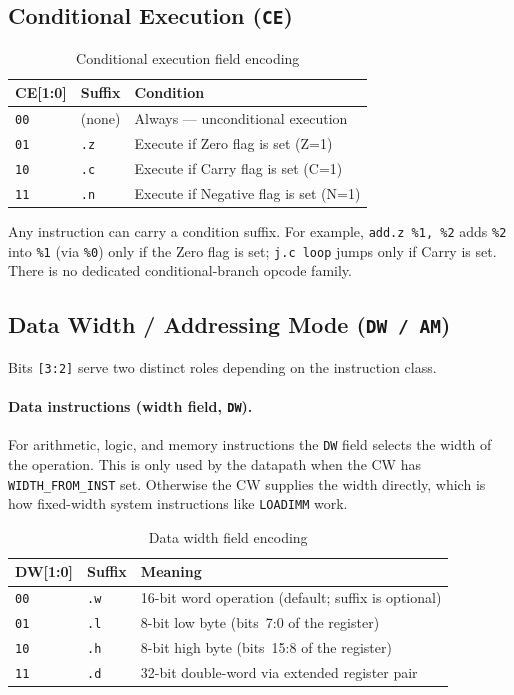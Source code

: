 \documentclass[a4paper,12pt]{report}
\newcommand{\asm}[1]{\texttt{#1}}
\newcommand{\field}[1]{\texttt{\small #1}}
\newcommand{\reg}[1]{\texttt{\%#1}}
\begin{document}
\subsection{Conditional Execution (\field{CE})}
\label{sec:cond}

\begin{table}[htbp]
\centering
\caption{Conditional execution field encoding}
\begin{tabularx}{\textwidth}{llX}
    \toprule
    \textbf{CE[1:0]} & \textbf{Suffix} & \textbf{Condition} \\
    \midrule
    \texttt{00} & (none) & Always --- unconditional execution \\
    \texttt{01} & \asm{.z} & Execute if Zero flag is set (Z=1) \\
    \texttt{10} & \asm{.c} & Execute if Carry flag is set (C=1) \\
    \texttt{11} & \asm{.n} & Execute if Negative flag is set (N=1) \\
    \bottomrule
\end{tabularx}
\end{table}

Any instruction can carry a condition suffix. For example, \asm{add.z \%1, \%2} adds \reg{2} into \reg{1} (via \reg{0}) only if the Zero flag is set; \asm{j.c loop} jumps only if Carry is set. There is no dedicated conditional-branch opcode family.

\subsection{Data Width / Addressing Mode (\field{DW / AM})}
\label{sec:dw-am}

Bits \field{[3:2]} serve two distinct roles depending on the instruction class.

\paragraph{Data instructions (width field, \field{DW}).}
For arithmetic, logic, and memory instructions the \field{DW} field selects the width of the operation. This is only used by the datapath when the CW has \field{WIDTH\_FROM\_INST} set. Otherwise the CW supplies the width directly, which is how fixed-width system instructions like \asm{LOADIMM} work.

\begin{table}[htbp]
\centering
\caption{Data width field encoding}
\begin{tabularx}{\textwidth}{llX}
    \toprule
    \textbf{DW[1:0]} & \textbf{Suffix} & \textbf{Meaning} \\
    \midrule
    \texttt{00} & \asm{.w} & 16-bit word operation (default; suffix is optional) \\
    \texttt{01} & \asm{.l} & 8-bit low byte (bits~7:0 of the register) \\
    \texttt{10} & \asm{.h} & 8-bit high byte (bits~15:8 of the register) \\
    \texttt{11} & \asm{.d} & 32-bit double-word via extended register pair \\
    \bottomrule
\end{tabularx}
\end{table}
\end{document}
